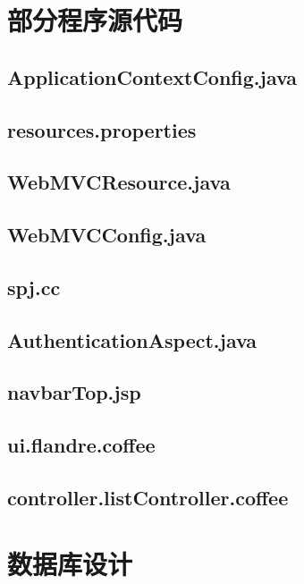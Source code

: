 
\chapter{部分程序源代码}
\section{ApplicationContextConfig.java}\label{sec:ApplicationContextConfig}


\section{resources.properties}\label{sec:resources}


\section{WebMVCResource.java}\label{sec:WebMVCResource}


\section{WebMVCConfig.java}\label{sec:WebMVCConfig}


\section{spj.cc}\label{sec:spj}


\section{AuthenticationAspect.java}\label{sec:AuthenticationAspect}


\section{navbarTop.jsp}\label{sec:navbarTop}


\section{ui.flandre.coffee}\label{sec:flandre}


\section{controller.listController.coffee}\label{sec:listController}


\chapter{数据库设计}\label{sec:databasediagram}

